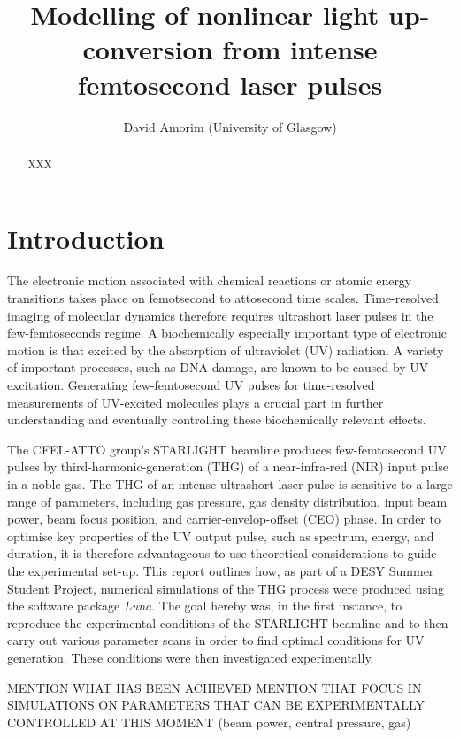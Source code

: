 \documentclass[a4paper]{jpconf}
\begin{document}

\title{Modelling of nonlinear light up-conversion from intense femtosecond laser pulses}
\author{David Amorim (University of Glasgow)}
\address{DESY Summer Student Programme 2023 \\ Group:  Attosecond Science (CFEL-ATTO) \\ Institute: Centre for Free-Electron Laser Science (CFEL)\\ Supervisor: Josina Hahne}

\thispagestyle{plain}
\pagestyle{plain}
\setlength{\footskip}{5pt}

\begin{abstract}
XXX
\end{abstract}


\section{Introduction}
The electronic motion associated with chemical reactions or atomic energy transitions takes place on femotsecond to attosecond time scales. Time-resolved imaging of molecular dynamics therefore requires ultrashort laser pulses in the few-femtoseconds regime. A biochemically especially important type of electronic motion is that excited by the absorption of ultraviolet (UV) radiation. A variety of important processes, such as DNA damage, are known to be caused by UV excitation. Generating few-femtosecond UV pulses for time-resolved measurements of UV-excited molecules plays a crucial part in further understanding and eventually controlling these biochemically relevant effects. \par 
The CFEL-ATTO group's STARLIGHT beamline produces few-femtosecond UV  pulses by third-harmonic-generation (THG) of a near-infra-red (NIR) input pulse in a noble gas. The THG of an intense ultrashort laser pulse is sensitive to a large range of parameters, including gas pressure, gas density distribution, input beam power, beam focus position, and carrier-envelop-offset (CEO) phase. In order to optimise key properties of the UV output pulse, such as spectrum, energy, and duration, it is therefore advantageous to use theoretical considerations to guide the experimental set-up. This report outlines how, as part of a DESY Summer Student Project, numerical simulations of the THG process were produced using the software package \emph{Luna}. The goal hereby was, in the first instance, to reproduce the experimental conditions of the STARLIGHT beamline and to then carry out various parameter scans in order to find optimal conditions for UV generation. These conditions were then investigated experimentally. \par  
MENTION WHAT HAS BEEN ACHIEVED
MENTION THAT FOCUS IN SIMULATIONS ON PARAMETERS THAT CAN BE EXPERIMENTALLY CONTROLLED AT THIS MOMENT (beam power, central pressure, gas) 
\end{document}
